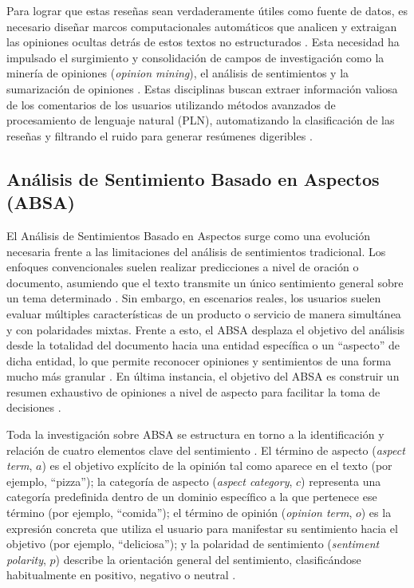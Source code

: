 Para lograr que estas reseñas sean verdaderamente útiles como fuente de datos, es necesario diseñar marcos computacionales automáticos que analicen y extraigan las opiniones ocultas detrás de estos textos no estructurados \parencite{ZhangEtAl2022}. Esta necesidad ha impulsado el surgimiento y consolidación de campos de investigación como la minería de opiniones (\emph{opinion mining}), el análisis de sentimientos y la sumarización de opiniones \parencite{ZhangEtAl2022}. Estas disciplinas buscan extraer información valiosa de los comentarios de los usuarios utilizando métodos avanzados de procesamiento de lenguaje natural (PLN), automatizando la clasificación de las reseñas y filtrando el ruido para generar resúmenes digeribles \parencite{AliEtAl2016, KimEtAl2010}.

\subsection{Análisis de Sentimiento Basado en Aspectos (ABSA)}\label{subsec:absa}

El Análisis de Sentimientos Basado en Aspectos surge como una evolución necesaria frente a las limitaciones del análisis de sentimientos tradicional. Los enfoques convencionales suelen realizar predicciones a nivel de oración o documento, asumiendo que el texto transmite un único sentimiento general sobre un tema determinado \parencite{ZhangEtAl2022}. Sin embargo, en escenarios reales, los usuarios suelen evaluar múltiples características de un producto o servicio de manera simultánea y con polaridades mixtas. Frente a esto, el ABSA desplaza el objetivo del análisis desde la totalidad del documento hacia una entidad específica o un \enquote{aspecto} de dicha entidad, lo que permite reconocer opiniones y sentimientos de una forma mucho más granular \parencite{ZhangEtAl2022}. En última instancia, el objetivo del ABSA es construir un resumen exhaustivo de opiniones a nivel de aspecto para facilitar la toma de decisiones \parencite{ZhangEtAl2022}.

Toda la investigación sobre ABSA se estructura en torno a la identificación y relación de cuatro elementos clave del sentimiento \parencite{ZhangEtAl2022}. El término de aspecto (\emph{aspect term}, $a$) es el objetivo explícito de la opinión tal como aparece en el texto (por ejemplo, \enquote{pizza}); la categoría de aspecto (\emph{aspect category}, $c$) representa una categoría predefinida dentro de un dominio específico a la que pertenece ese término (por ejemplo, \enquote{comida}); el término de opinión (\emph{opinion term}, $o$) es la expresión concreta que utiliza el usuario para manifestar su sentimiento hacia el objetivo (por ejemplo, \enquote{deliciosa}); y la polaridad de sentimiento (\emph{sentiment polarity}, $p$) describe la orientación general del sentimiento, clasificándose habitualmente en positivo, negativo o neutral \parencite{ZhangEtAl2022}.

